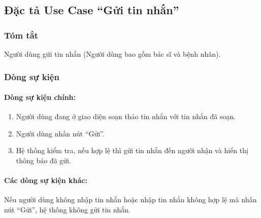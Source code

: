 \subsection{Đặc tả Use Case ``Gửi tin nhắn''}

\subsubsection{Tóm tắt}
Người dùng gửi tin nhắn (Người dùng bao gồm bác sĩ và bệnh nhân).

\subsubsection{Dòng sự kiện}
\paragraph{\textbf{Dòng sự kiện chính:}}
\begin{enumerate}
    \item Người dùng đang ở giao diện soạn thảo tin nhắn với tin nhắn đã soạn.
    \item Người dùng nhấn nút ``Gửi''.
    \item Hệ thống kiểm tra, nếu hợp lệ thì gửi tin nhắn đến người nhận và hiển thị thông báo đã gửi.
\end{enumerate}

\paragraph{\textbf{Các dòng sự kiện khác:}}
Nếu người dùng không nhập tin nhắn hoặc nhập tin nhắn không hợp lệ mà nhấn nút ``Gửi'', hệ thống không gửi tin nhắn.

